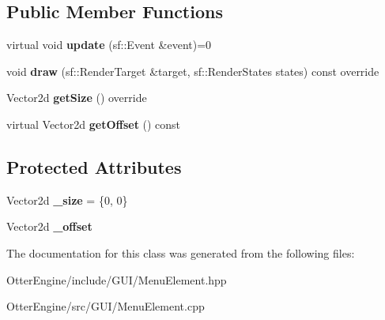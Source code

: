 \subsection*{Public Member Functions}
\begin{DoxyCompactItemize}
\item 
virtual void {\bfseries update} (sf\+::\+Event \&event)=0\hypertarget{class_otter_engine_1_1_menu_element_a589f2ddb2e37024e91f98d3a17a6afdf}{}\label{class_otter_engine_1_1_menu_element_a589f2ddb2e37024e91f98d3a17a6afdf}

\item 
void {\bfseries draw} (sf\+::\+Render\+Target \&target, sf\+::\+Render\+States states) const override\hypertarget{class_otter_engine_1_1_menu_element_ac5b63729573c527f7a8234b8b53eecb9}{}\label{class_otter_engine_1_1_menu_element_ac5b63729573c527f7a8234b8b53eecb9}

\item 
Vector2d {\bfseries get\+Size} () override\hypertarget{class_otter_engine_1_1_menu_element_a2ba632b48c48e2bc7d833d098e75f16a}{}\label{class_otter_engine_1_1_menu_element_a2ba632b48c48e2bc7d833d098e75f16a}

\item 
virtual Vector2d {\bfseries get\+Offset} () const \hypertarget{class_otter_engine_1_1_menu_element_a5bb9a08b63dcb945328d002db1831dee}{}\label{class_otter_engine_1_1_menu_element_a5bb9a08b63dcb945328d002db1831dee}

\end{DoxyCompactItemize}
\subsection*{Protected Attributes}
\begin{DoxyCompactItemize}
\item 
Vector2d {\bfseries \+\_\+size} = \{0, 0\}\hypertarget{class_otter_engine_1_1_menu_element_a5b40571b46866835d5e165e10106cc61}{}\label{class_otter_engine_1_1_menu_element_a5b40571b46866835d5e165e10106cc61}

\item 
Vector2d {\bfseries \+\_\+offset}\hypertarget{class_otter_engine_1_1_menu_element_a6eae780235a4f168f8b38eb0ea0a0bf4}{}\label{class_otter_engine_1_1_menu_element_a6eae780235a4f168f8b38eb0ea0a0bf4}

\end{DoxyCompactItemize}


The documentation for this class was generated from the following files\+:\begin{DoxyCompactItemize}
\item 
Otter\+Engine/include/\+G\+U\+I/Menu\+Element.\+hpp\item 
Otter\+Engine/src/\+G\+U\+I/Menu\+Element.\+cpp\end{DoxyCompactItemize}
